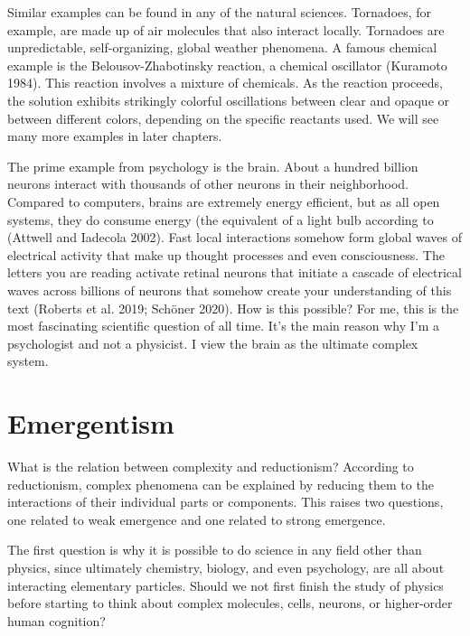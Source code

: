 \documentclass[
  a4paper,
  DIV=11,
  numbers=noendperiod]{scrreprt}
\begin{document}
Similar examples can be found in any of the natural sciences. Tornadoes,
for example, are made up of air molecules that also interact locally.
Tornadoes are unpredictable, self-organizing, global weather phenomena.
A famous chemical example is the Belousov-Zhabotinsky reaction, a
chemical oscillator (Kuramoto 1984). This reaction involves a mixture of
chemicals. As the reaction proceeds, the solution exhibits strikingly
colorful oscillations between clear and opaque or between different
colors, depending on the specific reactants used. We will see many more
examples in later chapters.

The prime example from psychology is the brain. About a hundred billion
neurons interact with thousands of other neurons in their neighborhood.
Compared to computers, brains are extremely energy efficient, but as all
open systems, they do consume energy (the equivalent of a light bulb
according to (Attwell and Iadecola 2002). Fast local interactions
somehow form global waves of electrical activity that make up thought
processes and even consciousness. The letters you are reading activate
retinal neurons that initiate a cascade of electrical waves across
billions of neurons that somehow create your understanding of this text
(Roberts et al. 2019; Schöner 2020). How is this possible? For me, this
is the most fascinating scientific question of all time. It's the main
reason why I'm a psychologist and not a physicist. I view the brain as
the ultimate complex system.

\hypertarget{sec-Emergentism}{%
\section{Emergentism}\label{sec-Emergentism}}

What is the relation between complexity and reductionism? According to
reductionism, complex phenomena can be explained by reducing them to the
interactions of their individual parts or components. This raises two
questions, one related to weak emergence and one related to strong
emergence.

The first question is why it is possible to do science in any field
other than physics, since ultimately chemistry, biology, and even
psychology, are all about interacting elementary particles. Should we
not first finish the study of physics before starting to think about
complex molecules, cells, neurons, or higher-order human cognition?
\end{document}
